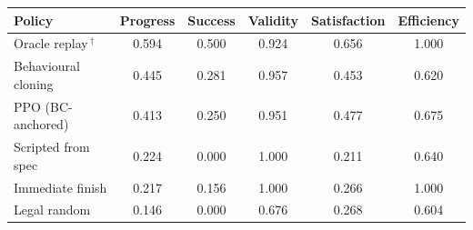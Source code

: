 \begin{tabular}{lccccc}
\toprule
Policy & Progress & Success & Validity & Satisfaction & Efficiency \\
\midrule
Oracle replay\,$^\dagger$ & 0.594 & 0.500 & 0.924 & 0.656 & 1.000 \\
\midrule
Behavioural cloning & 0.445 & 0.281 & 0.957 & 0.453 & 0.620 \\
PPO (BC-anchored) & 0.413 & 0.250 & 0.951 & 0.477 & 0.675 \\
Scripted from spec & 0.224 & 0.000 & 1.000 & 0.211 & 0.640 \\
Immediate finish & 0.217 & 0.156 & 1.000 & 0.266 & 1.000 \\
Legal random & 0.146 & 0.000 & 0.676 & 0.268 & 0.604 \\
\bottomrule
\end{tabular}
